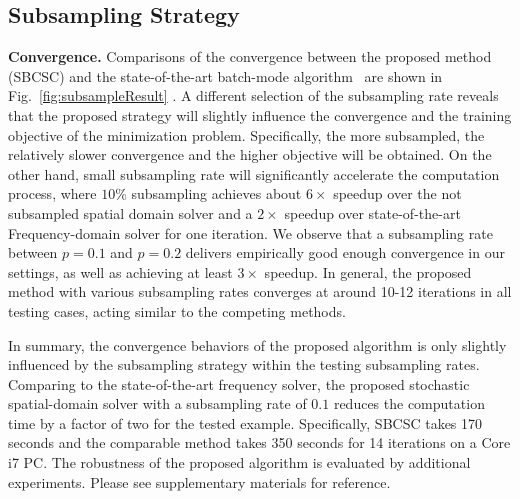 \subsection{Subsampling Strategy}

{\bfseries Convergence.} Comparisons of the convergence between the
proposed method (SBCSC) and the state-of-the-art batch-mode
algorithm~\cite{heide2015fast} are shown in
Fig.~\ref{fig:subsampleResult} . A different selection of the
subsampling rate reveals that the proposed strategy will slightly
influence the convergence and the training objective of the
minimization problem. Specifically, the more subsampled, the
relatively slower convergence and the higher objective will be
obtained. On the other hand, small subsampling rate will significantly
accelerate the computation process, where $10\%$ subsampling achieves
about $6 \times$ speedup over the not subsampled spatial domain solver
and a $2 \times$ speedup over state-of-the-art Frequency-domain solver
for one iteration. We observe that a subsampling rate between $p=0.1$
and $p=0.2$ delivers empirically good enough convergence in our
settings, as well as achieving at least $3 \times$ speedup. In
general, the proposed method with various subsampling rates converges
at around 10-12 iterations in all testing cases, acting similar to the
competing methods.

In summary, the convergence behaviors of the proposed
algorithm is only slightly influenced by the subsampling strategy
within the testing subsampling rates. Comparing to the
state-of-the-art frequency solver, the proposed stochastic
spatial-domain solver with a subsampling rate of $0.1$ reduces the
computation time by a factor of two for the tested example. Specifically,
SBCSC takes 170 seconds and the comparable method takes 350 seconds for
14 iterations on a Core i7 PC. The
robustness of the proposed algorithm is evaluated by additional
experiments. Please see supplementary materials for reference.

